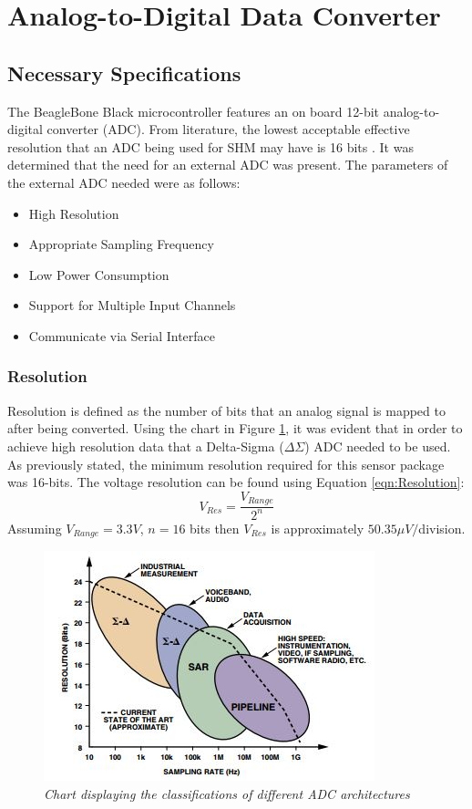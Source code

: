 \section{Analog-to-Digital Data Converter}
\subsection{Necessary Specifications}
\label{sec:ADC_Parameters}
\indent The BeagleBone Black microcontroller features an on board 12-bit analog-to-digital converter (ADC). From literature, the lowest acceptable
effective resolution that an ADC being used for SHM may have is 16 bits\cite{Cunha_Caetano} \cite{JangSWMWSS}. It was determined that the need for an
external ADC was present. The parameters of the external ADC needed were as follows:
\begin{itemize}
\item High Resolution
\item Appropriate Sampling Frequency
\item Low Power Consumption 
\item Support for Multiple Input Channels
\item Communicate via Serial Interface
\end{itemize}
\subsubsection{Resolution}
\label{sec:adc_res}
\indent Resolution is defined as the number of bits that an analog signal is mapped to after being converted\cite{MusaJouaneh:2013}. Using the chart in
Figure \ref{fig:ADC_Comp_Chart}, it was evident that in order to achieve high resolution data that a Delta-Sigma ($\Delta\Sigma$) ADC needed to be used.\\
\indent As previously stated, the minimum resolution required for this sensor package was 16-bits. The voltage resolution can be found using Equation
\ref{eqn:Resolution}:
\begin{equation}
\label{eqn:Resolution}
V_{Res} = \frac{V_{Range}}{2^{n}}
\end{equation}
Assuming $V_{Range}=3.3V$, $n=16$ bits then $V_{Res}$ is approximately $50.35\mu V/$division. 

\begin{figure}[H]
\centering
\includegraphics[scale=1]{./KIRBY_Images/ADC_Comp_Chart.jpg}
\caption{\textit{Chart displaying the classifications of different ADC architectures \cite{WaltKester:2005}}}
\label{fig:ADC_Comp_Chart}
\end{figure}
%
